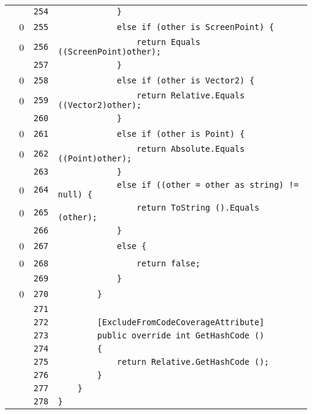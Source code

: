 \documentclass[a4paper,10pt]{article}
\begin{document}
\begin{longtable}[l]{lrrl}
\cellcolor{gray} &  & \verb~254~ & \verb~            }~\\
\cellcolor{red} & 0 & \verb~255~ & \verb~            else if (other is ScreenPoint) {~\\
\cellcolor{red} & 0 & \verb~256~ & \verb~                return Equals ((ScreenPoint)other);~\\
\cellcolor{gray} &  & \verb~257~ & \verb~            }~\\
\cellcolor{red} & 0 & \verb~258~ & \verb~            else if (other is Vector2) {~\\
\cellcolor{red} & 0 & \verb~259~ & \verb~                return Relative.Equals ((Vector2)other);~\\
\cellcolor{gray} &  & \verb~260~ & \verb~            }~\\
\cellcolor{red} & 0 & \verb~261~ & \verb~            else if (other is Point) {~\\
\cellcolor{red} & 0 & \verb~262~ & \verb~                return Absolute.Equals ((Point)other);~\\
\cellcolor{gray} &  & \verb~263~ & \verb~            }~\\
\cellcolor{red} & 0 & \verb~264~ & \verb~            else if ((other = other as string) != null) {~\\
\cellcolor{red} & 0 & \verb~265~ & \verb~                return ToString ().Equals (other);~\\
\cellcolor{gray} &  & \verb~266~ & \verb~            }~\\
\cellcolor{red} & 0 & \verb~267~ & \verb~            else {~\\
\cellcolor{red} & 0 & \verb~268~ & \verb~                return false;~\\
\cellcolor{gray} &  & \verb~269~ & \verb~            }~\\
\cellcolor{red} & 0 & \verb~270~ & \verb~        }~\\
\cellcolor{gray} &  & \verb~271~ & \verb~~\\
\cellcolor{gray} &  & \verb~272~ & \verb~        [ExcludeFromCodeCoverageAttribute]~\\
\cellcolor{gray} &  & \verb~273~ & \verb~        public override int GetHashCode ()~\\
\cellcolor{gray} &  & \verb~274~ & \verb~        {~\\
\cellcolor{gray} &  & \verb~275~ & \verb~            return Relative.GetHashCode ();~\\
\cellcolor{gray} &  & \verb~276~ & \verb~        }~\\
\cellcolor{gray} &  & \verb~277~ & \verb~    }~\\
\cellcolor{gray} &  & \verb~278~ & \verb~}~\\
\end{longtable}
\newpage
\end{document}
